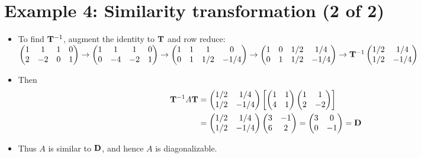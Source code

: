 \documentclass[11pt,a4paper]{article}
\begin{document}
	\section*{Example 4: Similarity transformation (2 of 2)}
	\begin{itemize}
		\item To find $\vb{T}^{-1}$, augment the identity to $\vb{T}$ and row reduce:\\
		$
		\begin{pmatrix}
			1 & 1 & 1 & 0\\
			2 & -2 & 0 & 1
		\end{pmatrix}\to
		\begin{pmatrix}
			1 & 1 & 1 & 0\\
			0 & -4 & -2 & 1
		\end{pmatrix}\to
		\begin{pmatrix}
			1 & 1 & 1 & 0\\
			0 & 1 & 1/2 & -1/4
		\end{pmatrix}\to
		\begin{pmatrix}
			1 & 0 & 1/2 & 1/4\\
			0 & 1 & 1/2 & -1/4
		\end{pmatrix}\to \vb{T}^{-1}
		\begin{pmatrix}
			1/2 & 1/4\\
			1/2 & -1/4
		\end{pmatrix}
		$
		\item Then
		\begin{align*}
			\vb{T}^{-1}A\vb{T} &=
			\begin{pmatrix}
				1/2 & 1/4\\
				1/2 & -1/4
			\end{pmatrix}
			\left[
				\begin{pmatrix}
					1 & 1\\
					4 & 1
				\end{pmatrix}
				\begin{pmatrix}
					1 & 1\\
					2 & -2
				\end{pmatrix}
			\right]\\
			&=
			\begin{pmatrix}
				1/2 & 1/4\\
				1/2 & -1/4
			\end{pmatrix}
			\begin{pmatrix}
				3 & -1\\
				6 & 2
			\end{pmatrix} =
			\begin{pmatrix}
				3 & 0\\
				0 & -1
			\end{pmatrix} = \vb{D}
		\end{align*}
		\item Thus $A$ is similar to $\vb{D}$, and hence $A$ is diagonalizable.
	\end{itemize}
\end{document}
